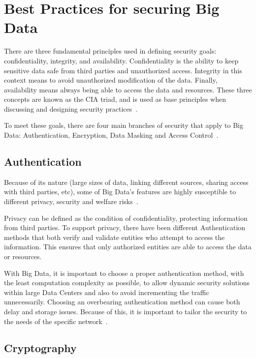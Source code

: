 \section{Best Practices for securing Big Data}
There are three fundamental principles used in defining 
security goals: confidentiality, integrity, and availability.
Confidentiality is the ability to keep sensitive data safe
from third parties and unauthorized access. Integrity in
this context means to avoid unauthorized modification of
the data. Finally, availability means always being able
to access the data and resources. These three concepts
are known as the CIA triad, and is used as base principles
when discussing and designing 
security practices~\cite{hamlin2016cryptography}.

To meet these goals, there are four main branches of 
security that apply to Big Data: Authentication, 
Encryption, Data Masking and Access Control~\cite{abouelmehdi201773}.

\subsection{Authentication}

Because of its nature (large sizes of data, linking different
sources, sharing access with third parties, etc), some of
Big Data's features are highly susceptible to different 
privacy, security and welfare risks~\cite{kshetri2014big}.

Privacy can be defined as the condition of confidentiality, 
protecting information from third parties. To support privacy,
there have been different Authentication methods that both
verify and validate entities who attempt to access the 
information. This ensures that only authorized entities 
are able to access the data or resources. 

With Big Data, it is important to choose a proper authentication
method, with the least computation complexity as possible,
to allow dynamic security solutions within large Data Centers
and also to avoid incrementing the traffic unnecessarily. 
Choosing an overbearing authentication method can cause both 
delay and storage issues.  Because of this, it is important 
to tailor the security to the needs of the
specific network~\cite{Thayananthan2015big}.

\subsection{Cryptography}

